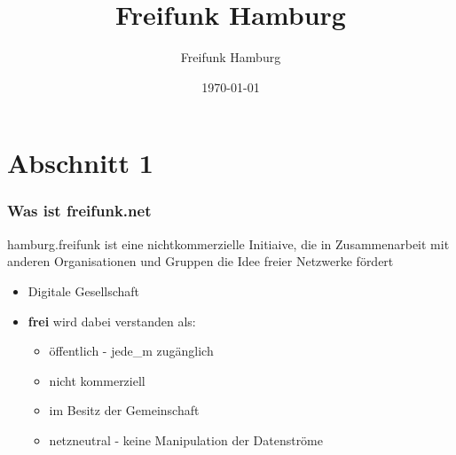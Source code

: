 \documentclass[aspectratio=43]{beamer}
\title{Freifunk Hamburg}
\author{Freifunk Hamburg}
\date{\today}
\begin{document}
\maketitle
\frame{\tableofcontents[currentsection]}
 
\section{Abschnitt 1}
\begin{frame} %
  \frametitle{Was ist freifunk.net} %
  hamburg.freifunk ist eine nichtkommerzielle Initiaive, die in Zusammenarbeit mit anderen Organisationen und Gruppen die Idee freier Netzwerke fördert
  \begin{itemize}

	\item Digitale Gesellschaft	
  \end{itemize}
  
\end{frame}

\begin{frame}
\begin{itemize}
	\item \textbf{frei} wird dabei verstanden als:
	\begin{itemize}
		\item öffentlich - jede\_m zugänglich
		\item nicht kommerziell
		\item im Besitz der Gemeinschaft
		\item netzneutral - keine Manipulation der Datenströme
	\end{itemize}
	
\end{itemize}
\end{frame}
\end{document}
